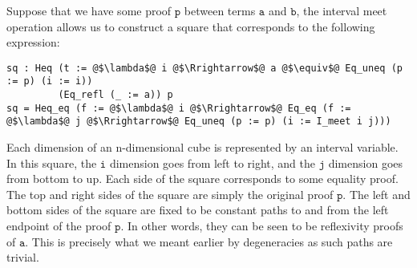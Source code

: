 \documentclass[12pt,twoside,maitrise]{dms}
\theoremstyle{definition}
\numberwithin{equation}{section}
\numberwithin{table}{chapter}
\numberwithin{figure}{chapter}
\newcommand\id[1] {\texttt{#1}}
\newcommand\fn[1] {\texttt{#1}}
\begin{document}
Suppose that we have some proof $\fn{p}$ between terms $\fn{a}$ and $\fn{b}$,
the interval meet operation allows us to construct a square that corresponds to
the following expression:

\begin{verbatim}
sq : Heq (t := @$\lambda$@ i @$\Rrightarrow$@ a @$\equiv$@ Eq_uneq (p := p) (i := i))
         (Eq_refl (_ := a)) p
sq = Heq_eq (f := @$\lambda$@ i @$\Rrightarrow$@ Eq_eq (f := @$\lambda$@ j @$\Rrightarrow$@ Eq_uneq (p := p) (i := I_meet i j)))
\end{verbatim}

Each dimension of an n-dimensional cube is represented by an interval variable.
In this square, the $\id{i}$ dimension goes from left to right, and the $\id{j}$
dimension goes from bottom to up. Each side of the square corresponds to some
equality proof. The top and right sides of the square are simply the original
proof $\id{p}$. The left and bottom sides of the square are fixed to be constant
paths to and from the left endpoint of the proof $\id{p}$. In other words, they
can be seen to be reflexivity proofs of $\id{a}$. This is precisely what we
meant earlier by degeneracies as such paths are trivial.
\end{document}
